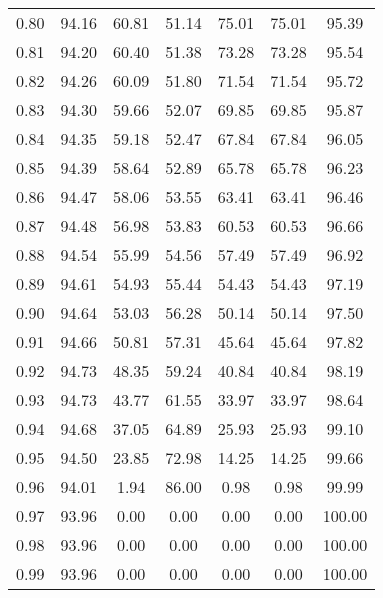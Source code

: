 \begin{tabular}{|c|c|c|c|c|c|c|}
      0.80 &     94.16 &     60.81 &      51.14 &   75.01 &      75.01 &         95.39 \\
      0.81 &     94.20 &     60.40 &      51.38 &   73.28 &      73.28 &         95.54 \\
      0.82 &     94.26 &     60.09 &      51.80 &   71.54 &      71.54 &         95.72 \\
      0.83 &     94.30 &     59.66 &      52.07 &   69.85 &      69.85 &         95.87 \\
      0.84 &     94.35 &     59.18 &      52.47 &   67.84 &      67.84 &         96.05 \\
      0.85 &     94.39 &     58.64 &      52.89 &   65.78 &      65.78 &         96.23 \\
      0.86 &     94.47 &     58.06 &      53.55 &   63.41 &      63.41 &         96.46 \\
      0.87 &     94.48 &     56.98 &      53.83 &   60.53 &      60.53 &         96.66 \\
      0.88 &     94.54 &     55.99 &      54.56 &   57.49 &      57.49 &         96.92 \\
      0.89 &     94.61 &     54.93 &      55.44 &   54.43 &      54.43 &         97.19 \\
      0.90 &     94.64 &     53.03 &      56.28 &   50.14 &      50.14 &         97.50 \\
      0.91 &     94.66 &     50.81 &      57.31 &   45.64 &      45.64 &         97.82 \\
      0.92 &     94.73 &     48.35 &      59.24 &   40.84 &      40.84 &         98.19 \\
      0.93 &     94.73 &     43.77 &      61.55 &   33.97 &      33.97 &         98.64 \\
      0.94 &     94.68 &     37.05 &      64.89 &   25.93 &      25.93 &         99.10 \\
      0.95 &     94.50 &     23.85 &      72.98 &   14.25 &      14.25 &         99.66 \\
      0.96 &     94.01 &      1.94 &      86.00 &    0.98 &       0.98 &         99.99 \\
      0.97 &     93.96 &      0.00 &       0.00 &    0.00 &       0.00 &        100.00 \\
      0.98 &     93.96 &      0.00 &       0.00 &    0.00 &       0.00 &        100.00 \\
      0.99 &     93.96 &      0.00 &       0.00 &    0.00 &       0.00 &        100.00 \\
\bottomrule
\end{tabular}
